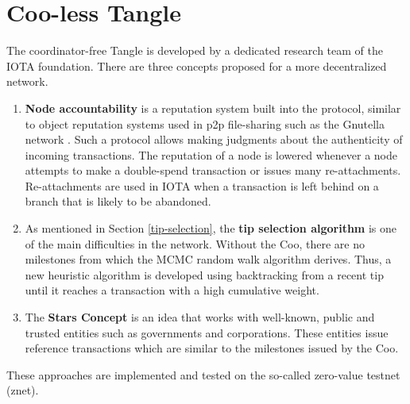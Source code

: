 \section{Coo-less Tangle}\label{coo-less-tangle}
The coordinator-free Tangle is developed by a dedicated research team of the IOTA foundation. There are three concepts proposed for a more decentralized network.
\begin{enumerate}
    \item \textbf{Node accountability} is a reputation system built into the protocol, similar to object reputation systems used in p2p file-sharing such as the Gnutella network \cite{object-reputation-system}. Such a protocol allows making judgments about the authenticity of incoming transactions. The reputation of a node is lowered whenever a node attempts to make a double-spend transaction or issues many re-attachments. Re-attachments are used in IOTA when a transaction is left behind on a branch that is likely to be abandoned.
    \item As mentioned in Section \ref{tip-selection}, the \textbf{tip selection algorithm} is one of the main difficulties in the network. Without the Coo, there are no milestones from which the MCMC random walk algorithm derives. Thus, a new heuristic algorithm is developed using backtracking from a recent tip until it reaches a transaction with a high cumulative weight.    
    \item The \textbf{Stars Concept} is an idea that works with well-known, public and trusted entities such as governments and corporations. These entities issue reference transactions which are similar to the milestones issued by the Coo.
\end{enumerate}

These approaches are implemented and tested on the so-called zero-value testnet (znet).
